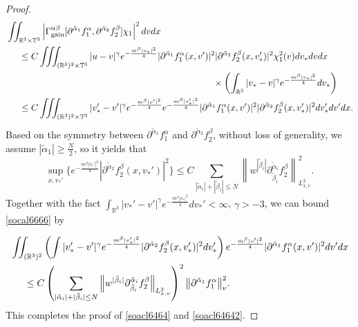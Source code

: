 \documentclass[reqno]{amsart}
\numberwithin{equation}{section}
\numberwithin{equation}{section}
\begin{document}
\begin{proof}
		\begin{align}
			&\iint_{\mathbb{R}^3\times\mathbb{T}^3}  \left| \Gamma_{\text{gain}}^{\alpha \beta} [\partial^{\tilde{\alpha}_1}f^{\alpha}_1, \partial^{\tilde{\alpha}_2}f^{\beta}_2] \chi_1 \right|^2  dv dx\notag\\
			&\hspace{0.5cm}\leq C\iiint_{(\mathbb{R}^3)^2\times\mathbb{T}^3} |u-v|^\gamma  e^{-\frac{m^{\beta}|v_*|^2}{4}}|\partial^{\tilde{\alpha}_1}f^{\alpha}_1(x,v')|^2 |\partial^{\tilde{\alpha}_2}f^{\beta}_2 (x,v_*')|^2 \chi_1^2(v) dv_*dv dx\notag\\
			&\hspace{8cm}\times\left(\int_{\mathbb{R}^3}|v_*-v|^\gamma e^{-\frac{m^{\beta}|v_*|^2}{4}} dv_*\right)\notag\\
			&\hspace{0.5cm}\leq C\iiint_{(\mathbb{R}^3)^2\times\mathbb{T}^3}|v_*'-v'|^\gamma e^{-\frac{m^{\beta}|v'|^2}{4}}e^{-\frac{m^{\beta}|v_*'|^2}{4}}|\partial^{\tilde{\alpha}_1}f^{\alpha}_1(x,v')|^2 |\partial^{\tilde{\alpha}_2}f^{\beta}_2 (x,v_*')|^2dv_*'dv'dx.\label{socal6666}
		\end{align}
		Based on the symmetry between $\partial^{\tilde{\alpha}_1}f^{\alpha}_1$ and $\partial^{\tilde{\alpha}_2}f^{\beta}_2$, without loss of generality, we assume $\left|\tilde{\alpha}_1 \right| \geq \frac{N}{2}$, so it yields that
		\begin{equation*}
		\sup_{x,v_*'}\Big\{e^{-\frac{m^{\beta}|v_*'|^2}{4}}|\partial^{\tilde{\alpha}_2}f^{\beta}_2 (x,v_*')|^2\Big\}\leq C \sum_{| \tilde{\alpha}_i |+| \tilde{\beta}_i | \le N} \left\| w^{| \tilde{\beta}_i |} \partial_{\tilde{\beta}_i}^{\tilde{\alpha}_i}f^{\beta}_2 \right\|_{L^{2}_{x,v}}^2.
		\end{equation*}
		Together with the fact $\int_{\mathbb{R}^3}|v_*'-v'|^\gamma e^{-\frac{m^{\beta}|v_*|^2}{4}} dv_*'<\infty$, $\gamma>-3$, we can bound  \eqref{socal6666} by
		
		\begin{equation}
		\begin{aligned}
			&\iint_{(\mathbb{R}^3)^2}\left(\int|v_*'-v'|^\gamma e^{-\frac{m^{\beta}|v_*'|^2}{4}}|\partial^{\tilde{\alpha}_2}f^{\beta}_2 (x,v_*')|^2dv_*'\right)e^{-\frac{m^{\beta}|v'|^2}{4}}|\partial^{\tilde{\alpha}_1}f^{\alpha}_1(x,v')|^2dv'dx\\
			&\hspace{0.5cm}\leq C\left( \sum_{| \tilde{\alpha}_i |+| \tilde{\beta}_i | \le N} \left\| w^{| \tilde{\beta}_i |} \partial_{\tilde{\beta}_i}^{\tilde{\alpha}_i}f^{\beta}_2 \right\|_{L^{2}_{x,v}} \right)^2\big\|\partial^{\tilde{\alpha}_1}f^{\alpha}_1\big\|^2_{\nu}.\label{socal666777}
		\end{aligned}
		\end{equation}
		This completes the proof of \eqref{soacl6464} and \eqref{soacl64642}.
		

\end{proof}
\end{document}
